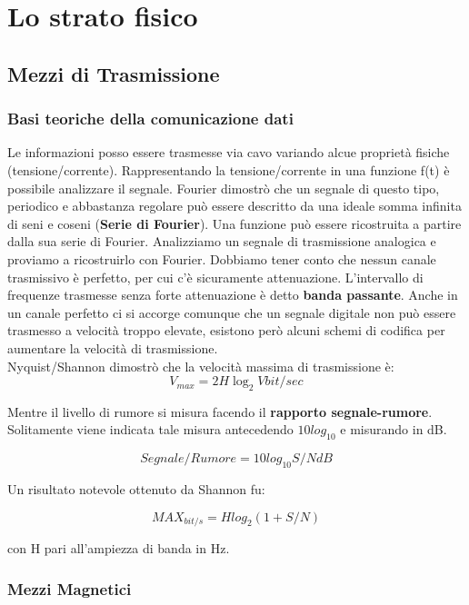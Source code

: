 \section{Lo strato fisico}

\subsection{Mezzi di Trasmissione}

\subsubsection{Basi teoriche della comunicazione dati}

Le informazioni posso essere trasmesse via cavo variando alcue proprietà fisiche (tensione/corrente). Rappresentando la tensione/corrente in una funzione f(t) è possibile analizzare il segnale. Fourier dimostrò che un segnale di questo tipo, periodico e abbastanza regolare può essere descritto da una ideale somma infinita di seni e coseni (\textbf{Serie di Fourier}). Una funzione può essere ricostruita  a partire dalla sua serie di Fourier. Analizziamo un segnale di trasmissione analogica e proviamo a ricostruirlo con Fourier. Dobbiamo tener conto che nessun canale trasmissivo è perfetto, per cui c'è sicuramente attenuazione. L'intervallo di frequenze trasmesse senza forte attenuazione è detto \textbf{banda passante}. Anche in un canale perfetto ci si accorge comunque che un segnale digitale non può essere trasmesso a velocità troppo elevate, esistono però alcuni schemi di codifica per aumentare la velocità di trasmissione.\\
Nyquist/Shannon dimostrò che la velocità massima di trasmissione è:\\

\[V_{max} = 2H\log_{2}V bit/sec\]

Mentre il livello di rumore si misura facendo il \textbf{rapporto segnale-rumore}. Solitamente viene indicata tale misura antecedendo \(10log_{10}\) e misurando in dB.

\[Segnale/Rumore = 10log_{10} S/N dB\]

Un risultato notevole ottenuto da Shannon fu:

\[MAX_{bit/s} = H log_{2}(1 + S/N)\]

con H pari all'ampiezza di banda in Hz.

\subsubsection{Mezzi Magnetici}

